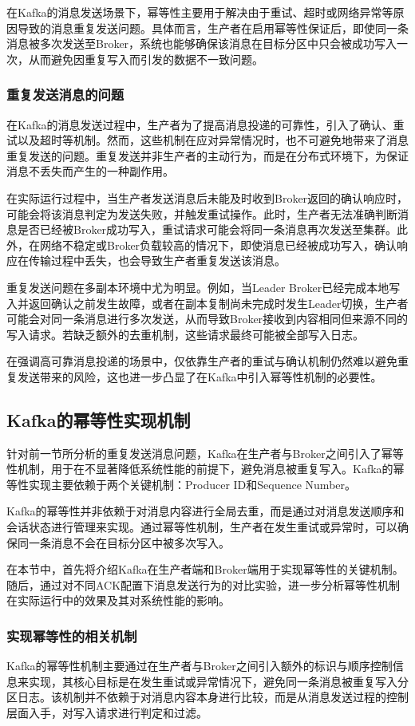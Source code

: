 在Kafka的消息发送场景下，幂等性主要用于解决由于重试、超时或网络异常等原因导致的消息重复发送问题。具体而言，生产者在启用幂等性保证后，即使同一条消息被多次发送至Broker，系统也能够确保该消息在目标分区中只会被成功写入一次，从而避免因重复写入而引发的数据不一致问题。
    \subsubsection{重复发送消息的问题}
在Kafka的消息发送过程中，生产者为了提高消息投递的可靠性，引入了确认、重试以及超时等机制。然而，这些机制在应对异常情况时，也不可避免地带来了消息重复发送的问题。重复发送并非生产者的主动行为，而是在分布式环境下，为保证消息不丢失而产生的一种副作用。

在实际运行过程中，当生产者发送消息后未能及时收到Broker返回的确认响应时，可能会将该消息判定为发送失败，并触发重试操作。此时，生产者无法准确判断消息是否已经被Broker成功写入，重试请求可能会将同一条消息再次发送至集群。此外，在网络不稳定或Broker负载较高的情况下，即使消息已经被成功写入，确认响应在传输过程中丢失，也会导致生产者重复发送该消息。

重复发送问题在多副本环境中尤为明显。例如，当Leader Broker已经完成本地写入并返回确认之前发生故障，或者在副本复制尚未完成时发生Leader切换，生产者可能会对同一条消息进行多次发送，从而导致Broker接收到内容相同但来源不同的写入请求。若缺乏额外的去重机制，这些请求最终可能被全部写入日志。

在强调高可靠消息投递的场景中，仅依靠生产者的重试与确认机制仍然难以避免重复发送带来的风险，这也进一步凸显了在Kafka中引入幂等性机制的必要性。
\subsection{Kafka的幂等性实现机制}
针对前一节所分析的重复发送消息问题，Kafka在生产者与Broker之间引入了幂等性机制，用于在不显著降低系统性能的前提下，避免消息被重复写入。Kafka的幂等性实现主要依赖于两个关键机制：Producer ID和Sequence Number\cite{Wang2018ExactlyOnceKafka}。

Kafka的幂等性并非依赖于对消息内容进行全局去重，而是通过对消息发送顺序和会话状态进行管理来实现。通过幂等性机制，生产者在发生重试或异常时，可以确保同一条消息不会在目标分区中被多次写入。

在本节中，首先将介绍Kafka在生产者端和Broker端用于实现幂等性的关键机制。随后，通过对不同ACK配置下消息发送行为的对比实验，进一步分析幂等性机制在实际运行中的效果及其对系统性能的影响。
    \subsubsection{实现幂等性的相关机制}
Kafka的幂等性机制主要通过在生产者与Broker之间引入额外的标识与顺序控制信息来实现，其核心目标是在发生重试或异常情况下，避免同一条消息被重复写入分区日志。该机制并不依赖于对消息内容本身进行比较，而是从消息发送过程的控制层面入手，对写入请求进行判定和过滤。

